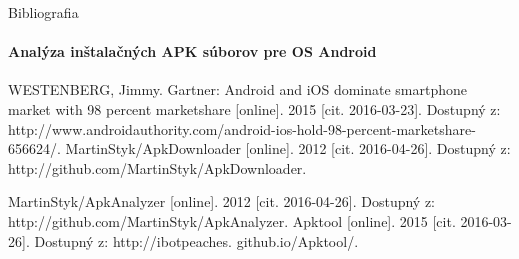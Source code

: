 \documentclass{beamer}
\begin{document}
  \begin{frame}[label=bibliography]{Bibliografia}
    \framesubtitle{Analýza inštalačných APK súborov pre OS Android}
    \begin{thebibliography}{9}
         WESTENBERG, Jimmy. Gartner: Android and iOS dominate smartphone
market with 98 percent marketshare [online]. 2015 [cit. 2016-03-23]. Dostupný
z: http://\-www.\-andro\-idautho\-ri\-ty.\-com/android-ios-hold-98-percent-marketshare-656624/.
      MartinStyk/ApkDownloader [online]. 2012 [cit. 2016-04-26]. Dostupný z: http://github.com/MartinStyk/ApkDownloader.
          
                MartinStyk/ApkAnalyzer [online]. 2012 [cit. 2016-04-26]. Dostupný z: http://github.com/MartinStyk/ApkAnalyzer.
          Apktool [online]. 2015 [cit. 2016-03-26]. Dostupný z: http://ibotpeaches.
github.io/Apktool/.

    
    \end{thebibliography}
  \end{frame}
\end{document}
